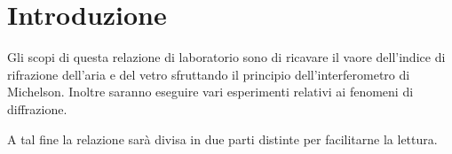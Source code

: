 \section{Introduzione}

Gli scopi di questa relazione di laboratorio sono di ricavare il vaore dell'indice di rifrazione dell'aria e del vetro sfruttando il principio dell'interferometro di Michelson. Inoltre saranno eseguire vari esperimenti relativi ai fenomeni di diffrazione.

A tal fine la relazione sarà divisa in due parti distinte per facilitarne la lettura.


